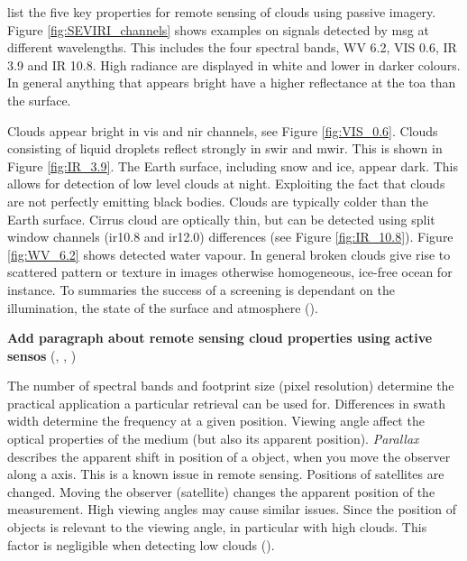 \citeauthor{Karlsson2015AdvancingData} list the five key properties for remote sensing of clouds using passive imagery. Figure \ref{fig:SEVIRI_channels} shows examples on signals detected by \acrshort{msg} at different wavelengths. This includes the four spectral bands, WV 6.2, VIS 0.6, IR 3.9 and IR 10.8. High radiance are displayed in white and lower in darker colours. In general anything that appears bright have a higher reflectance at the \acrshort{toa} than the surface. 

Clouds appear bright in \acrfull{vis} and \acrfull{nir} channels, see Figure \ref{fig:VIS_0.6}. Clouds consisting of liquid droplets reflect strongly in \acrfull{swir} and \acrfull{mwir}. This is shown in Figure \ref{fig:IR_3.9}. The Earth surface, including snow and ice, appear dark. This allows for detection of low level clouds at night. Exploiting the fact that clouds are not perfectly emitting black bodies. Clouds are typically colder than the Earth surface. Cirrus cloud are optically thin, but can be detected using split window channels (\acrshort{ir}10.8 and \acrshort{ir}12.0) differences (see Figure \ref{fig:IR_10.8}). Figure \ref{fig:WV_6.2} shows detected water vapour. In general broken clouds give rise to scattered pattern or texture in images otherwise homogeneous, ice-free ocean for instance. To summaries the success of a screening is dependant on the illumination, the state of the surface and atmosphere (\cite{Karlsson2015AdvancingData}).  

\textbf{Add paragraph about remote sensing cloud properties using active sensos} (\cite{Reuter2009TheCALIPSO}, \cite{Stephens2018CloudsatSystem}, \cite{Karlsson2015AdvancingData})

The number of spectral bands and footprint size (pixel resolution) determine the practical application a particular retrieval can be used for. Differences in swath width determine the frequency at a given position. Viewing angle affect the optical properties of the medium (but also its apparent position). \textit{Parallax} describes the apparent shift in position of a object, when you move the observer along a axis. This is a known issue in remote sensing. Positions of satellites are changed. Moving the observer (satellite) changes the apparent position of the measurement. 
High viewing angles may cause similar issues. Since the position of objects is relevant to the viewing angle, in particular with high clouds. This factor is negligible when detecting low clouds (\cite{Joro2010ComparisonFinland}). 

